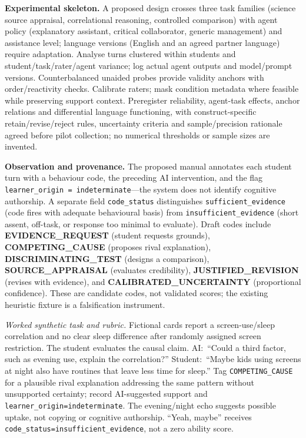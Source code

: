 \documentclass[10pt]{article}
\begin{document}
\smallskip\noindent\textbf{Experimental skeleton.} A proposed design crosses three task families
(science source appraisal, correlational reasoning, controlled comparison) with
agent policy (explanatory assistant, critical collaborator, generic management)
and assistance level; language versions (English and an agreed partner language)
require adaptation. Analyse turns clustered within students and student/task/rater/agent variance;
log actual agent outputs and model/prompt versions. Counterbalanced unaided probes
provide validity anchors with order/reactivity checks. Calibrate raters; mask condition metadata where
feasible while preserving support context. Preregister reliability, agent-task effects,
anchor relations and differential language functioning, with construct-specific
retain/revise/reject rules, uncertainty criteria and sample/precision rationale
agreed before pilot collection; no numerical thresholds or sample sizes are invented.

\smallskip\noindent\textbf{Observation and provenance.} The proposed manual annotates each student turn with a behaviour code, the preceding AI intervention, and the
flag \texttt{learner\_origin\ =\ indeterminate}---the system does not identify
cognitive authorship.  A separate field \texttt{code\_status} distinguishes
\texttt{sufficient\_evidence} (code fires with adequate behavioural basis)
from \texttt{insufficient\_evidence} (short assent, off-task, or response
too minimal to evaluate).  Draft codes include \textbf{EVIDENCE\_REQUEST}
(student requests grounds),
\textbf{COMPETING\_CAUSE} (proposes rival explanation),
\textbf{DISCRIMINATING\_TEST} (designs a comparison),
\textbf{SOURCE\_APPRAISAL} (evaluates credibility),
\textbf{JUSTIFIED\_REVISION} (revises with evidence), and
\textbf{CALIBRATED\_UNCERTAINTY} (proportional confidence).
These are candidate codes, not validated scores; the existing heuristic fixture
is a falsification instrument.

\smallskip\noindent\emph{Worked synthetic task and rubric.} Fictional cards report a screen-use/sleep
correlation and no clear sleep difference after randomly assigned screen restriction.
The student evaluates the causal claim. AI:~``Could a third factor, such as evening use,
explain the correlation?'' Student:~``Maybe kids using screens at night also have routines
that leave less time for sleep.'' Tag \texttt{COMPETING\_CAUSE} for a plausible rival
explanation addressing the same pattern without unsupported certainty; record AI-suggested
support and \texttt{learner\_origin=indeterminate}. The evening/night echo suggests possible uptake,
not copying or cognitive authorship. ``Yeah, maybe'' receives
\texttt{code\_status=insufficient\_evidence}, not a zero ability score.
\end{document}
